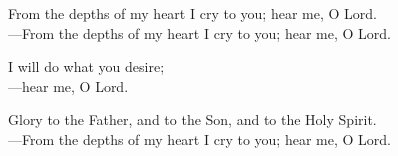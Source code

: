 \responsory

\noindent From the depths of my heart I cry to you; hear me, O Lord.\\
{\color{red}---\thinspace}From the depths of my heart I cry to you; hear me, O Lord.

\medskip\noindent I will do what you desire;\\
{\color{red}---\thinspace}hear me, O Lord.

\medskip\noindent Glory to the Father, and to the Son, and to the Holy Spirit.\\
{\color{red}---\thinspace}From the depths of my heart I cry to you; hear me, O Lord.